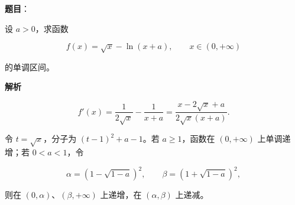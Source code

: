 \begin{answer}

\textbf{题目}：

设 $a>0$，求函数

\nopagebreak[4]
\[
f(x)=\sqrt{x}-\ln(x+a),\qquad x\in(0,+\infty)
\]

的单调区间。

\textbf{解析}

\nopagebreak[4]
\[
f'(x)=\frac1{2\sqrt x}-\frac1{x+a}
=\frac{x-2\sqrt x+a}{2\sqrt x(x+a)}.
\]

令 $t=\sqrt x$，分子为 $(t-1)^2+a-1$。若 $a\geqslant1$，函数在 $(0,+\infty)$ 上单调递增；若 $0<a<1$，令

\nopagebreak[4]
\[
\alpha=(1-\sqrt{1-a})^2,\qquad
\beta=(1+\sqrt{1-a})^2,
\]

则在 $(0,\alpha)$、$(\beta,+\infty)$ 上递增，在 $(\alpha,\beta)$ 上递减。


\end{answer}
